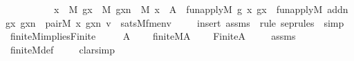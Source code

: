 \begin{isabellebody}
\ \ \ \ \ \ \ \ \ \ {\isacharparenleft}{\kern0pt}{\isasymexists}x\ {\isasymin}\ M{\isachardot}{\kern0pt}\ {\isasymexists}gx\ {\isasymin}\ M{\isachardot}{\kern0pt}\ {\isasymexists}gxn\ {\isasymin}\ M{\isachardot}{\kern0pt}\ x\ {\isasymnotin}\ A\ {\isasymand}\ fun{\isacharunderscore}{\kern0pt}apply{\isacharparenleft}{\kern0pt}{\isacharhash}{\kern0pt}{\isacharhash}{\kern0pt}M{\isacharcomma}{\kern0pt}\ g{\isacharcomma}{\kern0pt}\ x{\isacharcomma}{\kern0pt}\ gx{\isacharparenright}{\kern0pt}\ {\isasymand}\ fun{\isacharunderscore}{\kern0pt}apply{\isacharparenleft}{\kern0pt}{\isacharhash}{\kern0pt}{\isacharhash}{\kern0pt}M{\isacharcomma}{\kern0pt}\ addn{\isacharcomma}{\kern0pt}\ gx{\isacharcomma}{\kern0pt}\ gxn{\isacharparenright}{\kern0pt}\ {\isasymand}\ pair{\isacharparenleft}{\kern0pt}{\isacharhash}{\kern0pt}{\isacharhash}{\kern0pt}M{\isacharcomma}{\kern0pt}\ x{\isacharcomma}{\kern0pt}\ gxn{\isacharcomma}{\kern0pt}\ v{\isacharparenright}{\kern0pt}{\isacharparenright}{\kern0pt}{\isacharparenright}{\kern0pt}\ {\isasymlongleftrightarrow}\ sats{\isacharparenleft}{\kern0pt}M{\isacharcomma}{\kern0pt}{\isacharquery}{\kern0pt}fm{\isacharcomma}{\kern0pt}env{\isacharparenright}{\kern0pt}{\isachardoublequoteclose}\ \isanewline
%
\isadelimproof
\ \ %
\endisadelimproof
%
\isatagproof
{}\isamarkupfalse%
\ {\isacharparenleft}{\kern0pt}insert\ assms\ {\isacharsemicolon}{\kern0pt}\ {\isacharparenleft}{\kern0pt}rule\ sep{\isacharunderscore}{\kern0pt}rules\ {\isacharbar}{\kern0pt}\ simp{\isacharparenright}{\kern0pt}{\isacharplus}{\kern0pt}{\isacharparenright}{\kern0pt}%
\endisatagproof
{\isafoldproof}%
%
\isadelimproof
\ \isanewline
%
\endisadelimproof
\isanewline
{}\isamarkupfalse%
\ finite{\isacharunderscore}{\kern0pt}M{\isacharunderscore}{\kern0pt}implies{\isacharunderscore}{\kern0pt}Finite\ {\isacharcolon}{\kern0pt}\ \isanewline
\ \ \ A\ \isanewline
\ \ \ {\isachardoublequoteopen}finite{\isacharunderscore}{\kern0pt}M{\isacharparenleft}{\kern0pt}A{\isacharparenright}{\kern0pt}{\isachardoublequoteclose}\ \isanewline
\ \ \ {\isachardoublequoteopen}Finite{\isacharparenleft}{\kern0pt}A{\isacharparenright}{\kern0pt}{\isachardoublequoteclose}\ \isanewline
%
\isadelimproof
\isanewline
\ \ %
\endisadelimproof
%
\isatagproof
{}\isamarkupfalse%
\ assms\isanewline
\ \ \isamarkupfalse%
\ finite{\isacharunderscore}{\kern0pt}M{\isacharunderscore}{\kern0pt}def\ \isanewline
\ \ \isamarkupfalse%
\ clarsimp\isanewline
\ \ \isamarkupfalse%

\end{isabellebody}
